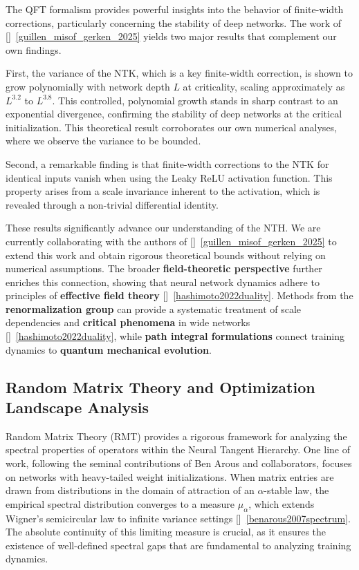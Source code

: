 The QFT formalism provides powerful insights into the behavior of finite-width corrections, particularly concerning the stability of deep networks. The work of []~\ref{guillen_misof_gerken_2025} yields two major results that complement our own findings.

First, the variance of the NTK, which is a key finite-width correction, is shown to grow polynomially with network depth $L$ at criticality, scaling approximately as $L^{3.2}$ to $L^{3.8}$. This controlled, polynomial growth stands in sharp contrast to an exponential divergence, confirming the stability of deep networks at the critical initialization. This theoretical result corroborates our own numerical analyses, where we observe the variance to be bounded.

Second, a remarkable finding is that finite-width corrections to the NTK for identical inputs vanish when using the Leaky ReLU activation function. This property arises from a scale invariance inherent to the activation, which is revealed through a non-trivial differential identity.

These results significantly advance our understanding of the NTH. We are currently collaborating with the authors of []~\ref{guillen_misof_gerken_2025} to extend this work and obtain rigorous theoretical bounds without relying on numerical assumptions. The broader \textbf{field-theoretic perspective} further enriches this connection, showing that neural network dynamics adhere to principles of \textbf{effective field theory} []~\ref{hashimoto2022duality}. Methods from the \textbf{renormalization group} can provide a systematic treatment of scale dependencies and \textbf{critical phenomena} in wide networks []~\ref{hashimoto2022duality}, while \textbf{path integral formulations} connect training dynamics to \textbf{quantum mechanical evolution}.

\subsection{Random Matrix Theory and Optimization Landscape Analysis}

Random Matrix Theory (RMT) provides a rigorous framework for analyzing the spectral properties of operators within the Neural Tangent Hierarchy. One line of work, following the seminal contributions of Ben Arous and collaborators, focuses on networks with heavy-tailed weight initializations. When matrix entries are drawn from distributions in the domain of attraction of an $\alpha$-stable law, the empirical spectral distribution converges to a measure $\mu_\alpha$, which extends Wigner's semicircular law to infinite variance settings []~\ref{benarous2007spectrum}. The absolute continuity of this limiting measure is crucial, as it ensures the existence of well-defined spectral gaps that are fundamental to analyzing training dynamics.

